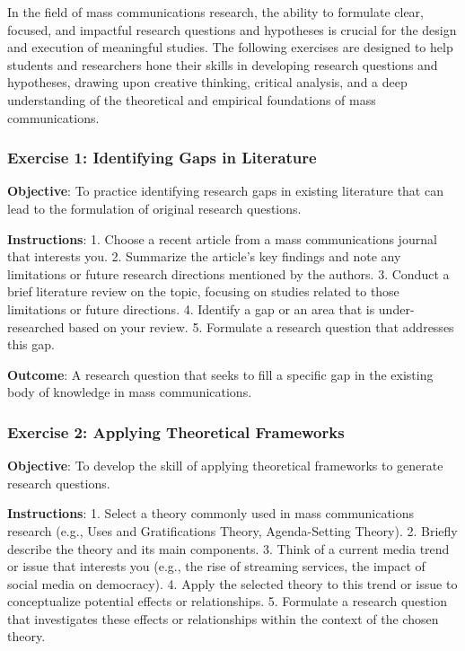 \documentclass[
]{book}
\begin{document}
In the field of mass communications research, the ability to formulate clear, focused, and impactful research questions and hypotheses is crucial for the design and execution of meaningful studies. The following exercises are designed to help students and researchers hone their skills in developing research questions and hypotheses, drawing upon creative thinking, critical analysis, and a deep understanding of the theoretical and empirical foundations of mass communications.

\hypertarget{exercise-1-identifying-gaps-in-literature}{%
\subsubsection*{Exercise 1: Identifying Gaps in Literature}\label{exercise-1-identifying-gaps-in-literature}}

\textbf{Objective}: To practice identifying research gaps in existing literature that can lead to the formulation of original research questions.

\textbf{Instructions}:
1. Choose a recent article from a mass communications journal that interests you.
2. Summarize the article's key findings and note any limitations or future research directions mentioned by the authors.
3. Conduct a brief literature review on the topic, focusing on studies related to those limitations or future directions.
4. Identify a gap or an area that is under-researched based on your review.
5. Formulate a research question that addresses this gap.

\textbf{Outcome}: A research question that seeks to fill a specific gap in the existing body of knowledge in mass communications.

\hypertarget{exercise-2-applying-theoretical-frameworks}{%
\subsubsection*{Exercise 2: Applying Theoretical Frameworks}\label{exercise-2-applying-theoretical-frameworks}}

\textbf{Objective}: To develop the skill of applying theoretical frameworks to generate research questions.

\textbf{Instructions}:
1. Select a theory commonly used in mass communications research (e.g., Uses and Gratifications Theory, Agenda-Setting Theory).
2. Briefly describe the theory and its main components.
3. Think of a current media trend or issue that interests you (e.g., the rise of streaming services, the impact of social media on democracy).
4. Apply the selected theory to this trend or issue to conceptualize potential effects or relationships.
5. Formulate a research question that investigates these effects or relationships within the context of the chosen theory.
\end{document}
